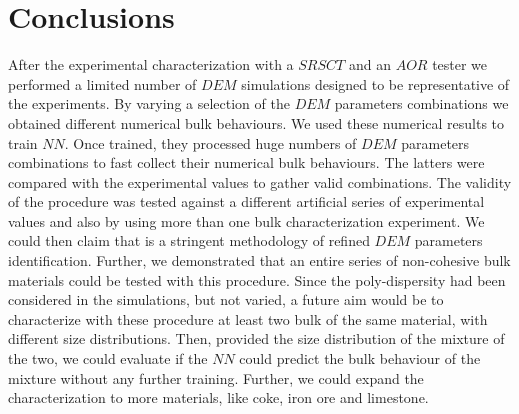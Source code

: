 \section{Conclusions}
\label{sec:conclusions}
After the experimental characterization with a $SRSCT$ and an $AOR$ tester we performed a 
limited number of $DEM$ simulations designed to be representative of the experiments. 
By varying a selection of the $DEM$ parameters combinations we obtained different numerical bulk behaviours. 
We used these numerical results to train $NN$. Once trained, they processed huge 
numbers of $DEM$ parameters combinations to fast collect their numerical bulk behaviours. 
The latters were compared with the experimental values to gather valid combinations. 
The validity of the procedure was tested against a different artificial series of experimental 
values and also by using more than one bulk characterization experiment. 
We could then claim that is a stringent methodology of refined $DEM$ parameters identification. 
Further, we demonstrated that an entire series of non-cohesive bulk materials could be tested with this procedure.
Since the poly-dispersity had been considered in the simulations, but not varied, a future aim would 
be to characterize with these procedure at least two bulk of the same material, with different size distributions. 
Then, provided the size distribution of the mixture of the two, we could evaluate if the $NN$ could predict 
the bulk behaviour of the mixture without any further training. 
Further, we could expand the characterization to more materials, like coke, iron ore and limestone.
